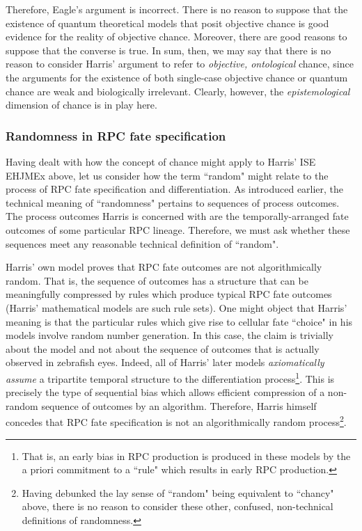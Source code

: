 Therefore, Eagle's argument is incorrect. There is no reason to suppose that the existence of quantum theoretical models that posit objective chance is good evidence for the reality of objective chance. Moreover, there are good reasons to suppose that the converse is true. In sum, then, we may say that there is no reason to consider Harris' argument to refer to \textit{objective, ontological} chance, since the arguments for the existence of both single-case objective chance or quantum chance are weak and biologically irrelevant. Clearly, however, the \textit{epistemological} dimension of chance is in play here.

\subsubsection{Randomness in RPC fate specification}

Having dealt with how the concept of chance might apply to Harris' ISE EHJMEx above, let us consider how the term ``random" might relate to the process of RPC fate specification and differentiation. As introduced earlier, the technical meaning of ``randomness" pertains to sequences of process outcomes. The process outcomes Harris is concerned with are the temporally-arranged fate outcomes of some particular RPC lineage. Therefore, we must ask whether these sequences meet any reasonable technical definition of ``random".

Harris' own model proves that RPC fate outcomes are not algorithmically random. That is, the sequence of outcomes has a structure that can be meaningfully compressed by rules which produce typical RPC fate outcomes (Harris' mathematical models are such rule sets). One might object that Harris' meaning is that the particular rules which give rise to cellular fate ``choice" in his models involve random number generation. In this case, the claim is trivially about the model and not about the sequence of outcomes that is actually observed in zebrafish eyes. Indeed, all of Harris' later models \textit{axiomatically assume} a tripartite temporal structure to the differentiation process\footnote{That is, an early bias in RPC production is produced in these models by the a priori commitment to a ``rule" which results in early RPC production.}. This is precisely the type of sequential bias which allows efficient compression of a non-random sequence of outcomes by an algorithm. Therefore, Harris himself concedes that RPC fate specification is not an algorithmically random process\footnote{Having debunked the lay sense of ``random" being equivalent to ``chancy" above, there is no reason to consider these other, confused, non-technical definitions of randomness.}.

